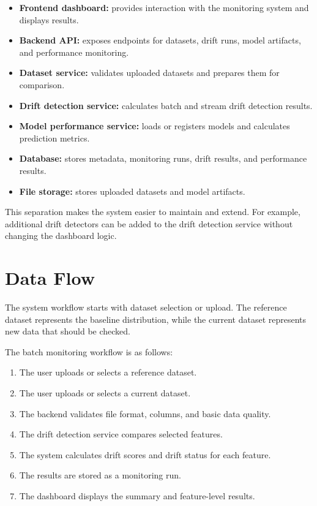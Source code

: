 \begin{itemize}
    \item \textbf{Frontend dashboard:} provides interaction with the monitoring system and displays results.
    \item \textbf{Backend API:} exposes endpoints for datasets, drift runs, model artifacts, and performance monitoring.
    \item \textbf{Dataset service:} validates uploaded datasets and prepares them for comparison.
    \item \textbf{Drift detection service:} calculates batch and stream drift detection results.
    \item \textbf{Model performance service:} loads or registers models and calculates prediction metrics.
    \item \textbf{Database:} stores metadata, monitoring runs, drift results, and performance results.
    \item \textbf{File storage:} stores uploaded datasets and model artifacts.
\end{itemize}

This separation makes the system easier to maintain and extend. For example, additional drift detectors can be added to the drift detection service without changing the dashboard logic.

\section{Data Flow}

The system workflow starts with dataset selection or upload. The reference dataset represents the baseline distribution, while the current dataset represents new data that should be checked.

The batch monitoring workflow is as follows:

\begin{enumerate}
    \item The user uploads or selects a reference dataset.
    \item The user uploads or selects a current dataset.
    \item The backend validates file format, columns, and basic data quality.
    \item The drift detection service compares selected features.
    \item The system calculates drift scores and drift status for each feature.
    \item The results are stored as a monitoring run.
    \item The dashboard displays the summary and feature-level results.
\end{enumerate}

